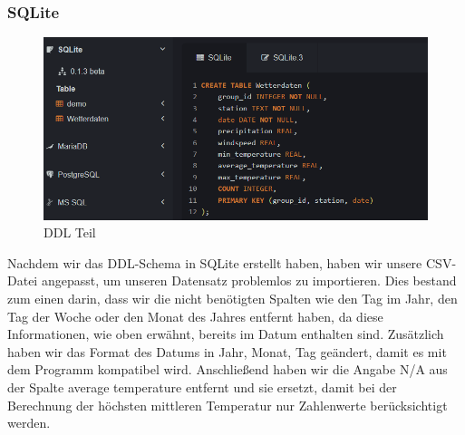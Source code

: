 \documentclass{article}
\begin{document}
\subsubsection{SQLite}
\begin{figure}[H]
    \centering
    \includegraphics[scale=0.8]{SQLite 1.png}
    \caption{DDL Teil}
\end{figure}
Nachdem wir das DDL-Schema in SQLite erstellt haben, haben wir unsere CSV-Datei angepasst, um unseren Datensatz problemlos zu importieren. Dies bestand zum einen darin, dass wir die nicht benötigten Spalten wie den Tag im Jahr, den Tag der Woche oder den Monat des Jahres entfernt haben, da diese Informationen, wie oben erwähnt, bereits im Datum enthalten sind. Zusätzlich haben wir das Format des Datums in Jahr, Monat, Tag geändert, damit es mit dem Programm kompatibel wird. Anschließend haben wir die Angabe N/A aus der Spalte average temperature entfernt und sie ersetzt, damit bei der Berechnung der höchsten mittleren Temperatur nur Zahlenwerte berücksichtigt werden.
\newpage
\end{document}
